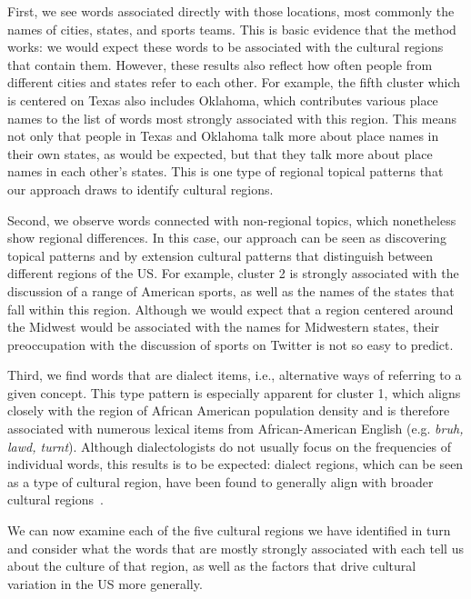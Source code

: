 \documentclass[../thesis.tex]{subfiles}
\begin{document}
First, we see words associated directly with those locations, most commonly the names of
cities, states, and sports teams. This is basic evidence that the method works: we would
expect these words to be associated with the cultural regions that contain them.
However, these results also reflect how often people from different cities and states
refer to each other. For example, the fifth cluster which is centered on Texas also
includes Oklahoma, which contributes various place names to the list of words most
strongly associated with this region. This means not only that people in Texas and
Oklahoma talk more about place names in their own states, as would be expected, but that
they talk more about place names in each other's states. This is one type of regional
topical patterns that our approach draws to identify cultural regions.

Second, we observe words connected with non-regional topics, which nonetheless show
regional differences. In this case, our approach can be seen as discovering topical
patterns and by extension cultural patterns that distinguish between different regions
of the US. For example, cluster 2 is strongly associated with the discussion of a range
of American sports, as well as the names of the states that fall within this region.
Although we would expect that a region centered around the Midwest would be associated
with the names for Midwestern states, their preoccupation with the discussion of sports
on Twitter is not so easy to predict. 

Third, we find words that are dialect items, i.e., alternative ways of referring to a
given concept. This type pattern is especially apparent for cluster 1, which aligns
closely with the region of African American population density and is therefore
associated with numerous lexical items from African-American English (e.g. \textit{bruh,
lawd, turnt}). Although dialectologists do not usually focus on the frequencies of
individual words, this results is to be expected: dialect regions, which can be seen as
a type of cultural region, have been found to generally align with broader cultural
regions~\cite{GrieveRegionalVariation2016}.

We can now examine each of the five cultural regions we have identified in turn and
consider what the words that are mostly strongly associated with each tell us about the
culture of that region, as well as the factors that drive cultural variation in the US
more generally. 
\end{document}
